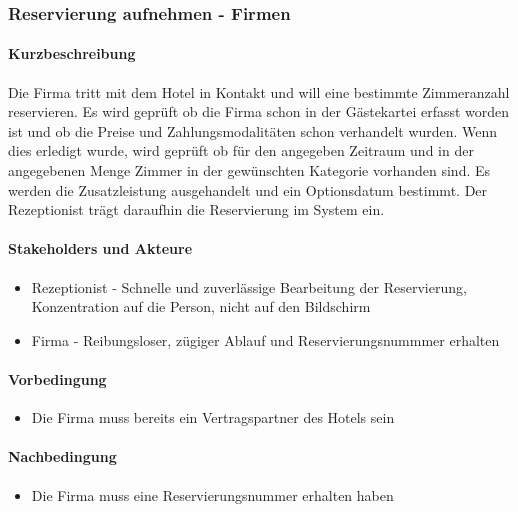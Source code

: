 \subsubsection{Reservierung aufnehmen - Firmen}

\paragraph{Kurzbeschreibung}  
Die Firma tritt mit dem Hotel in Kontakt und will eine bestimmte \Gls{Zimmer}anzahl reservieren. Es wird geprüft ob die Firma schon in der Gästekartei erfasst worden ist und ob die Preise und Zahlungsmodalitäten schon verhandelt wurden. Wenn dies erledigt wurde, wird geprüft ob für den angegeben Zeitraum und in der angegebenen Menge \Gls{Zimmer} in der gewünschten Kategorie vorhanden sind. Es werden die \Gls{Zusatzleistung} ausgehandelt und ein \Gls{Optionsdatum} bestimmt. Der \Gls{Rezeptionist} trägt daraufhin die Reservierung im System ein.

\paragraph{Stakeholders und Akteure}
\begin{itemize}
	\item \Gls{Rezeptionist} - Schnelle und zuverlässige Bearbeitung der \Gls{Reservierung}, Konzentration auf die Person, nicht auf den Bildschirm
	\item Firma - Reibungsloser, zügiger Ablauf und Reservierungsnummmer erhalten
\end{itemize}

\paragraph{Vorbedingung}
\begin{itemize}
	\item Die Firma muss bereits ein Vertragspartner des Hotels sein
\end{itemize}

\paragraph{Nachbedingung}
\begin{itemize}
	\item Die Firma muss eine Reservierungsnummer erhalten haben
\end{itemize}

